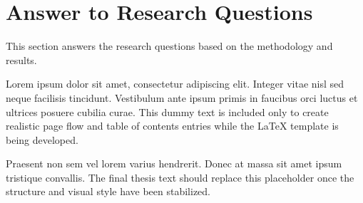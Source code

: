 \section{Answer to Research Questions}

This section answers the research questions based on the methodology and results.

Lorem ipsum dolor sit amet, consectetur adipiscing elit. Integer vitae nisl sed neque facilisis tincidunt. Vestibulum ante ipsum primis in faucibus orci luctus et ultrices posuere cubilia curae. This dummy text is included only to create realistic page flow and table of contents entries while the LaTeX template is being developed.

Praesent non sem vel lorem varius hendrerit. Donec at massa sit amet ipsum tristique convallis. The final thesis text should replace this placeholder once the structure and visual style have been stabilized.

